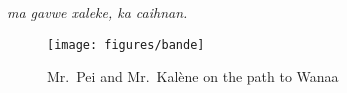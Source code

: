 



%

\begin{center}
	\textit{ma gavwe xaleke, ka caihnan.} 
\end{center}


\begin{figure}
	\texttt{[image: figures/bande]}
	\caption{Mr.\ Pei and Mr.\ Kalène on the path to Wanaa}
\end{figure}

